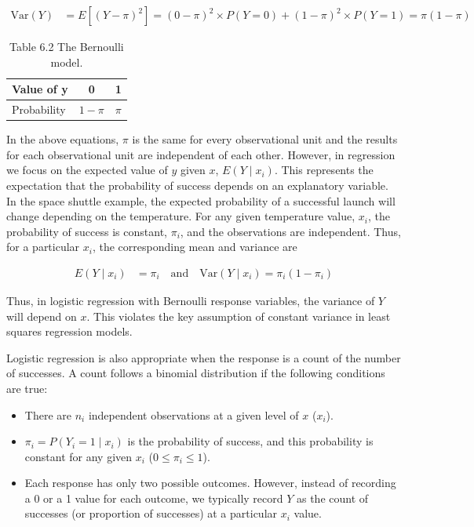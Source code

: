 \documentclass[
]{book}
\providecommand{\tightlist}{%
  \setlength{\itemsep}{0pt}\setlength{\parskip}{0pt}}
\begin{document}
\begin{align}
\mathrm{Var}(Y) &= E[(Y - \pi)^2] = (0 - \pi)^2 \times P(Y = 0) + (1 - \pi)^2 \times P(Y = 1) = \pi (1 - \pi) \tag{6.19}
\end{align}

\begin{table}[!h]
\centering
\caption{\label{tab:tab62}Table 6.2 The Bernoulli model.}
\centering
\begin{tabular}[t]{lcc}
\toprule
Value of y & 0 & 1\\
\midrule
Probability & $1 - \pi$ & $\pi$\\
\bottomrule
\end{tabular}
\end{table}

In the above equations, \(\pi\) is the same for every observational unit and the results for each observational unit are independent of each other. However, in regression we focus on the expected value of \(y\) given \(x\), \(E(Y \mid x_i)\). This represents the expectation that the probability of success depends on an explanatory variable. In the space shuttle example, the expected probability of a successful launch will change depending on the temperature. For any given temperature value, \(x_i\), the probability of success is constant, \(\pi_i\), and the observations are independent. Thus, for a particular \(x_i\), the corresponding mean and variance are

\begin{align}
E(Y \mid x_i) &= \pi_i \quad \text{and} \quad \mathrm{Var}(Y \mid x_i) = \pi_i (1 - \pi_i) 
\tag{6.20}
\end{align}

Thus, in logistic regression with Bernoulli response variables, the variance of \(Y\) will depend on \(x\). This violates
the key assumption of constant variance in least squares regression models.

Logistic regression is also appropriate when the response is a count of the number of successes. A count follows a binomial distribution if the following conditions are true:

\begin{itemize}
\tightlist
\item
  There are \(n_i\) independent observations at a given level of \(x\) (\(x_i\)).
\item
  \(\pi_i = P(Y_i = 1 \mid x_i)\) is the probability of success, and this probability is constant for any given \(x_i\) (\(0 \le \pi_i \le 1\)).
\item
  Each response has only two possible outcomes. However, instead of recording a 0 or a 1 value for each outcome, we typically record \(Y\) as the count of successes (or proportion of successes) at a particular \(x_i\) value.
\end{itemize}
\end{document}
